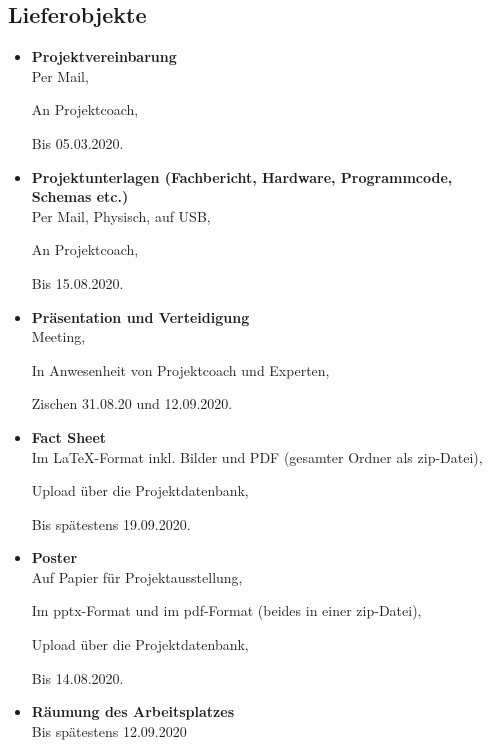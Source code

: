 \subsection{Lieferobjekte}\label{subsec:Lieferobjekte}
\begin{itemize}

\item \textbf{Projektvereinbarung}\\

Per Mail,

An Projektcoach,

Bis 05.03.2020. \\

\item \textbf{Projektunterlagen (Fachbericht, Hardware, Programmcode, Schemas etc.)}\\

Per Mail, Physisch, auf USB,

An Projektcoach,

Bis 15.08.2020.\\

\item \textbf{Präsentation und Verteidigung}\\

Meeting,

In Anwesenheit von Projektcoach und Experten,

Zischen 31.08.20 und 12.09.2020.\\

\item \textbf{Fact Sheet}\\

Im LaTeX-Format inkl. Bilder und PDF (gesamter Ordner als zip-Datei),

Upload über die Projektdatenbank,

Bis spätestens 19.09.2020.\\

\item \textbf{Poster}\\

Auf Papier für Projektausstellung,

Im pptx-Format und im pdf-Format (beides in einer zip-Datei),

Upload über die Projektdatenbank,

Bis 14.08.2020.\\

\item \textbf{Räumung des Arbeitsplatzes}\\

Bis spätestens 12.09.2020


\end{itemize}	
